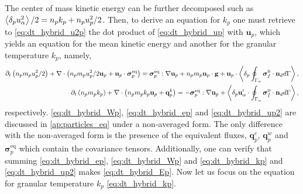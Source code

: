 The center of mass kinetic energy can be further decomposed such as $\left<\delta_p u_\alpha^2\right>/2 = n_p k_p + n_p u_p^2/2$. 
Then, to derive an equation for $k_p$ one must retrieve to \ref{eq:dt_hybrid_u2p} the dot product of \ref{eq:dt_hybrid_up} with $\textbf{u}_p$, which yields an equation for the mean kinetic energy and another for the granular temperature $k_p$, namely,
\begin{align}
    \label{eq:dt_hybrid_up2}
\pddt \left(n_p m_p u_p^2/ 2\right)
    + \div \left(n_p
    m_p u_p^2/ 2 \textbf{u}_p 
    + \textbf{u}_p \cdot \bm{\sigma}_p^\text{eq}
    \right)
    = 
    \bm{\sigma}_p^\text{eq}  :\grad \textbf{u}_p
    +  n_p m_p \textbf{u}_p \cdot 
     \textbf{g}
    + \textbf{u}_p \cdot \pSavg{{\bm{\sigma}_f^0 \cdot \textbf{n}_d}},\\
    \label{eq:dt_hybrid_kp}
    \pddt \left(n_p m_p k_p\right)
    + \div \left(n_p
    m_p k_p \textbf{u}_p 
    + \textbf{q}^k_p
    \right)
    = 
    - \bm{\sigma}_p^\text{eq}  :\grad \textbf{u}_p
    + \pavg{\textbf{u}_\alpha'\cdot\intS{\bm{\sigma}_f^0 \cdot \textbf{n}_d}},
\end{align}
respectively.
\ref{eq:dt_hybrid_Wp}, \ref{eq:dt_hybrid_ep} and \ref{eq:dt_hybrid_up2} are discussed in \ref{ap:particles_eq} under a non-averaged form.
The only difference with the non-averaged form is the presence of the equivalent fluxes, $\textbf{q}_p^e$, $\textbf{q}_p^w$ and $\bm\sigma^\text{eq}_p$ which contain the covariance tensors. 
Additionally, one can verify that summing \ref{eq:dt_hybrid_ep}, \ref{eq:dt_hybrid_Wp} and \ref{eq:dt_hybrid_kp} and \ref{eq:dt_hybrid_up2} makes \ref{eq:dt_hybrid_Ep}.  
Now let us focus on the equation for granular temperature $k_p$ \eqref{eq:dt_hybrid_kp}. 

